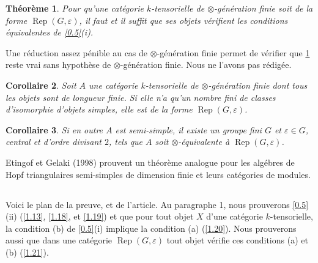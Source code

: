 \documentclass[11pt,a4paper]{article}
\theoremstyle{plain}
\newtheorem{theorem}{Th\'eor\`eme}
\newtheorem{corollary}[theorem]{Corollaire}
\theoremstyle{definition}
\newcommand{\Rep}{\operatorname{Rep}}
\begin{document}
\begin{theorem}\label{0.6}
Pour qu'une cat\'egorie $k$-tensorielle de $\otimes$-g\'en\'eration finie soit de la forme $\Rep(G,\varepsilon)$, il faut et il suffit que ses objets v\'erifient les conditions \'equivalentes de \ref{0.5}(i).
\end{theorem}

Une r\'eduction assez p\'enible au cas de $\otimes$-g\'en\'eration finie permet de v\'erifier que \ref{0.6} reste vrai sans hypoth\`ese de $\otimes$-g\'en\'eration finie. Nous ne l'avons pas r\'edig\'ee.

\begin{corollary}\label{0.7}
Soit $A$ une cat\'egorie $k$-tensorielle de $\otimes$-g\'en\'eration finie dont tous les objets sont de longueur finie. Si elle n'a qu'un nombre fini de classes d'isomorphie d'objets simples, elle est de la forme $\Rep(G,\varepsilon)$.
\end{corollary}

\begin{corollary}\label{0.8}
Si en outre $A$ est semi-simple, il existe un groupe fini $G$ et $\varepsilon\in G$, central et d'ordre divisant $2$, tels que $A$ soit $\otimes$-\'equivalente \`a $\Rep(G,\varepsilon)$.
\end{corollary}

Etingof et Gelaki (1998) prouvent un th\'eor\`eme analogue pour les alg\'ebres de Hopf triangulaires semi-simples de dimension finie et leurs cat\'egories de modules.

\subsection{}
\label{0.9}

Voici le plan de la preuve, et de l'article. Au paragraphe 1, nous prouverons \ref{0.5}(ii) (\ref{1.13}, \ref{1.18}, et \ref{1.19}) et que pour tout objet $X$ d'une cat\'egorie $k$-tensorielle, la condition (b) de \ref{0.5}(i) implique la condition (a) (\ref{1.20}). Nous prouverons aussi que dans une cat\'egorie $\Rep(G,\varepsilon)$ tout objet v\'erifie ces conditions (a) et (b) (\ref{1.21}).
\end{document}
